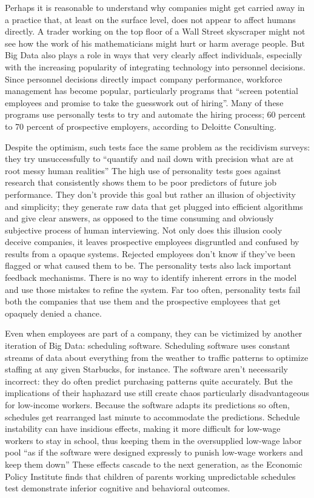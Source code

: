 \documentclass[sigconf]{acmart}
\begin{document}
	Perhaps it is reasonable to understand why companies might get carried away in a practice that, at least on the surface level, does not appear to affect humans directly. A trader working on the top floor of a Wall Street skyscraper might not see how the work of his mathematicians might hurt or harm average people. But Big Data also plays a role in ways that very clearly affect individuals, especially with the increasing popularity of integrating technology into personnel decisions. Since personnel decisions directly impact company performance, workforce management has become popular, particularly programs that ``screen potential employees and promise to take the guesswork out of hiring''\cite{Wharton2016}. Many of these programs use personally tests to try and automate the hiring process; 60 percent to 70 percent of prospective employers, according to Deloitte Consulting.

Despite the optimism, such tests face the same problem as the recidivism surveys: they try unsuccessfully to ``quantify and nail down with precision what are at root messy human realities''\cite{Wharton2016} The high use of personality tests goes against research that consistently shows them to be poor predictors of future job performance. They don't provide this goal but rather an illusion of objectivity and simplicity; they generate raw data that get plugged into efficient algorithms and give clear answers, as opposed to the time consuming and obviously subjective process of human interviewing. Not only does this illusion cooly deceive companies, it leaves prospective employees disgruntled and confused by results from a opaque systems. Rejected employees don't know if they've been flagged or what caused them to be. The personality tests also lack important feedback mechanisms. There is no way to identify inherent errors in the model and use those mistakes to refine the system\cite{Wharton2016}. Far too often, personality tests fail both the companies that use them and the prospective employees that get opaquely denied a chance.

Even when employees are part of a company, they can be victimized by another iteration of Big Data: scheduling software. Scheduling software uses constant streams of data about everything from the weather to traffic patterns to optimize staffing at any given Starbucks, for instance. The software aren't necessarily incorrect: they do often predict purchasing patterns quite accurately. But the implications of their haphazard use still create chaos particularly disadvantageous for low-income workers. Because the software adapts its predictions so often, schedules get rearranged last minute to accommodate the predictions. Schedule instability can have insidious effects, making it more difficult for low-wage workers to stay in school, thus keeping them in the oversupplied low-wage labor pool ``as if the software were designed expressly to punish low-wage workers and keep them down''\cite{Wharton2016} These effects cascade to the next generation, as the Economic Policy Institute finds that children of parents working unpredictable schedules test demonstrate inferior cognitive and behavioral outcomes\cite{Wharton2016}.
\end{document}
